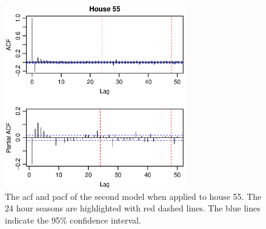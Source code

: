  \begin{figure}[!htb]
    \centering
    \includegraphics[width=0.7\textwidth]{../../../figures/arimax/ACF_55_short.eps}
    \caption{The acf and pacf of the second model when applied to house 55. The 24 hour seasons are highlighted with red dashed lines. The blue lines indicate the 95\% confidence interval.}
    \label{fig:Model2_acf_55}
\end{figure}

